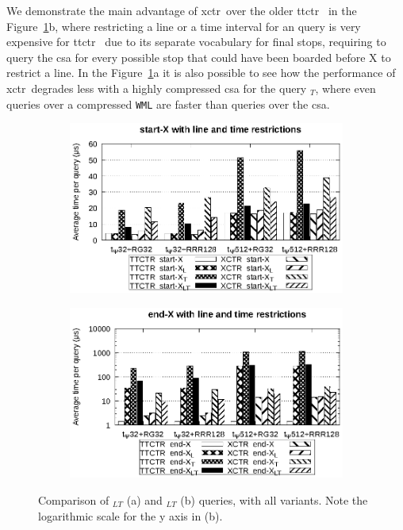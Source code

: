     We demonstrate the main advantage of \gls{xctr}~over the older \gls{ttctr}~ in the Figure~\ref{fig:start}b, where restricting a line or a time interval for an \endX query is very expensive for \gls{ttctr}~ due to its separate vocabulary for final stops, requiring to query the \gls{csa} for every possible stop that could have been boarded before X to restrict a line. In the Figure~\ref{fig:start}a it is also possible to see how the performance of \gls{xctr}~degrades less with a highly compressed \gls{csa} for the query \startX$_T$, where even queries over a compressed \texttt{WML} are faster than queries over the \gls{csa}.
    
    \begin{figure}[ht]
    \begin{subfigure}{0.5\linewidth}
    \includegraphics[width=\linewidth]{experiments/start.eps}
    \vspace{-12pt}
    \caption{}
    \vspace{-12pt}
    \end{subfigure}%
    \begin{subfigure}{0.5\linewidth}
    \includegraphics[width=\linewidth]{experiments/end.eps}
    \vspace{-12pt}
    \caption{}
    \vspace{-12pt}
    \end{subfigure}
    \caption{Comparison of \texttt{\startX$_{LT}$} (a) and \texttt{\endX$_{LT}$} (b) queries, with all variants. Note the logarithmic scale for the y axis in (b).}
    \label{fig:start}
    \end{figure}
    
